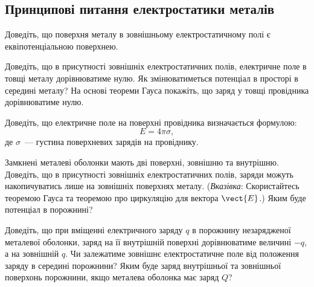 \subsection*{Принципові питання електростатики металів}


\begin{problem}
	Доведіть, що поверхня металу в зовнішньому електростатичному полі є еквіпотенціальною поверхнею. 
\end{problem}

\begin{problem}
	Доведіть, що в присутності зовнішніх електростатичних полів, електричне поле в товщі металу дорівнюватиме нулю. Як змінюватиметься потенціал в просторі в середині металу? На основі теореми Гауса покажіть, що заряд у товщі провідника дорівнюватиме нулю.
\end{problem}

\begin{problem}
	Доведіть, що електричне поле на поверхні провідника визначається формулою:
	\[
		E = 4\pi\sigma,
	\] 
	\noindent де $\sigma$~--- густина поверхневих зарядів на провіднику.
\end{problem}

%


\begin{problem}
	Замкнені металеві оболонки мають дві поверхні, зовнішню та внутрішню. Доведіть, що в присутності зовнішніх електростатичних полів, заряди можуть накопичуватись лише на зовнішніх поверхнях металу. (\textit{Вказівка}: Скористайтесь теоремою Гауса та теоремою про циркуляцію для вектора $\vect{E}$.) Яким буде потенціал в порожнині?
\end{problem}


\begin{problem}
	Доведіть, що при вміщенні електричного заряду $q$ в порожнину незарядженої металевої оболонки, заряд на її внутрішній поверхні дорівнюватиме величині $-q$, а на зовнішній $q$. Чи залежатиме зовнішнє електростатичне поле від положення заряду в середині порожнини? Яким буде заряд внутрішньої та зовнішньої поверхонь порожнини, якщо металева оболонка має заряд $Q$?
\end{problem}



